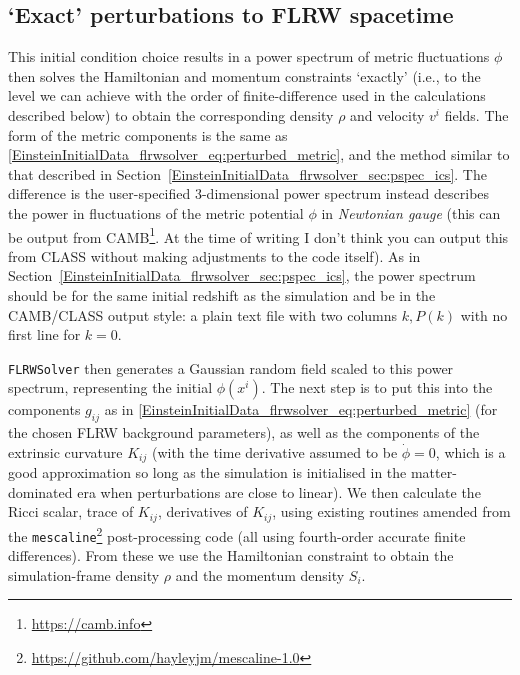 \subsection{`Exact' perturbations to FLRW spacetime}

This initial condition choice results in a power spectrum of metric fluctuations $\phi$ then solves the Hamiltonian and momentum constraints `exactly' (i.e., to the level we can achieve with the order of finite-difference used in the calculations described below) to obtain the corresponding density $\rho$ and velocity $v^i$ fields. 
The form of the metric components is the same as \eqref{EinsteinInitialData_flrwsolver_eq:perturbed_metric}, and the method similar to that described in Section~\ref{EinsteinInitialData_flrwsolver_sec:pspec_ics}. The difference is the user-specified 3-dimensional power spectrum instead describes the power in fluctuations of the metric potential $\phi$ in \textit{Newtonian gauge} (this can be output from CAMB\footnote{\url{https://camb.info}}. At the time of writing I don't think you can output this from CLASS without making adjustments to the code itself). As in Section~\ref{EinsteinInitialData_flrwsolver_sec:pspec_ics}, the power spectrum should be for the same initial redshift as the simulation and be in the CAMB/CLASS output style: a plain text file with two columns $k,P(k)$ with no first line for $k=0$. 

\texttt{FLRWSolver} then generates a Gaussian random field scaled to this power spectrum, representing the initial $\phi(x^i)$. The next step is to put this into the components $g_{ij}$ as in \eqref{EinsteinInitialData_flrwsolver_eq:perturbed_metric} (for the chosen FLRW background parameters), as well as the components of the extrinsic curvature $K_{ij}$ (with the time derivative assumed to be $\dot{\phi}=0$, which is a good approximation so long as the simulation is initialised in the matter-dominated era when perturbations are close to linear). We then calculate the Ricci scalar, trace of $K_{ij}$, derivatives of $K_{ij}$, using existing routines amended from the \texttt{mescaline}\footnote{\url{https://github.com/hayleyjm/mescaline-1.0}} post-processing code \cite{EinsteinInitialData_flrwsolver_macpherson2019} (all using fourth-order accurate finite differences). From these we use the Hamiltonian constraint to obtain the simulation-frame density $\rho$ and the momentum density $S_i$. 

